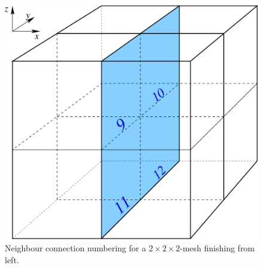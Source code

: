 %
\begin{figure}
  \centering
  \includegraphics[scale=0.3]{../figures/conn-left-right}
  \caption{Neighbour connection numbering for a $2 \times 2 \times
    2$-mesh finishing from left.}
  \label{fig:conn-left-right}
\end{figure}
%


\label{sec:lgr}

